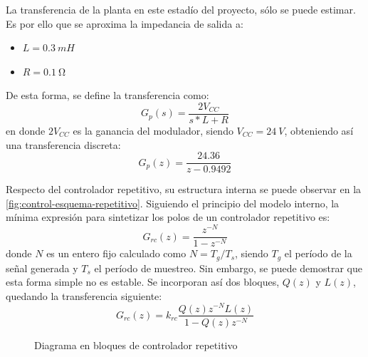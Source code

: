 \documentclass[titlepage, 12pt]{article}
\begin{document}
La transferencia de la planta en este estadío del proyecto, sólo se puede estimar. Es por ello que se aproxima la impedancia de salida a:
    \begin{itemize}
        \item $L = \SI{0.3}{mH}$
        \item $R = \SI{0.1}{\ohm}$
    \end{itemize}
De esta forma, se define la transferencia como:
\[
    G_p(s) = \frac{2V_{CC}}{s*L + R}
\]
en donde $2V_{CC}$ es la ganancia del modulador, siendo $V_{CC} = \SI{24}{V}$, obteniendo así una transferencia discreta:
\[
    G_p(z) = \frac{24.36}{z - 0.9492}
\]

Respecto del controlador repetitivo, su estructura interna se puede observar en la \autoref{fig:control-esquema-repetitivo}. Siguiendo el principio del modelo interno, la mínima expresión para sintetizar los polos de un controlador repetitivo es:
\[
    G_{rc}(z) = \frac{z^{-N}}{1-z^{-N}}
\]
donde $N$ es un entero fijo calculado como $N = T_g/T_s$, siendo $T_g$ el período de la señal generada y $T_s$ el período de muestreo. Sin embargo, se puede demostrar que esta forma simple no es estable. Se incorporan así dos bloques, $Q(z)$ y $L(z)$, quedando la transferencia siguiente:
\[
    G_{rc}(z) = k_{rc} \frac{Q(z) z^{-N} L(z)}{1-Q(z) z^{-N}}
\]

\begin{figure}[!htbp]
    \centering
    \caption{Diagrama en bloques de controlador repetitivo}
    \label{fig:control-esquema-repetitivo}
\end{figure}
\end{document}
